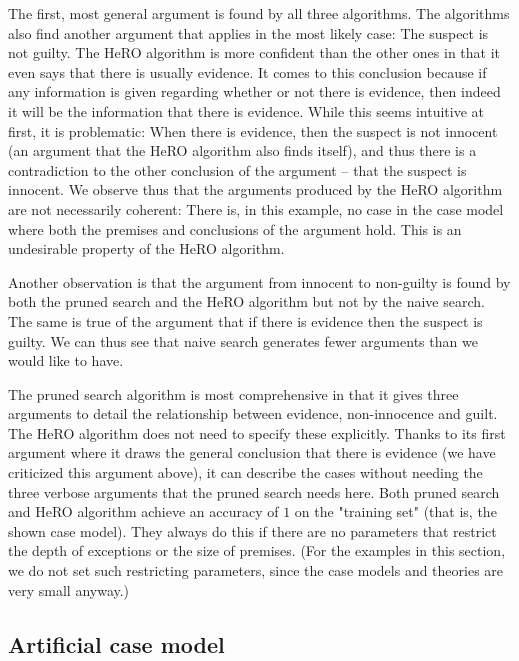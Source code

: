 The first, most general argument is found by all three algorithms. The algorithms also find another argument that applies in the most likely case: The suspect is not guilty. The HeRO algorithm is more confident than the other ones in that it even says that there is usually evidence. It comes to this conclusion because if any information is given regarding whether or not there is evidence, then indeed it will be the information that there is evidence. While this seems intuitive at first, it is problematic: When there is evidence, then the suspect is not innocent (an argument that the HeRO algorithm also finds itself), and thus there is a contradiction to the other conclusion of the argument -- that the suspect is innocent. We observe thus that the arguments produced by the HeRO algorithm are not necessarily coherent: There is, in this example, no case in the case model where both the premises and conclusions of the argument hold. This is an undesirable property of the HeRO algorithm.

Another observation is that the argument from innocent to non-guilty is found by both the pruned search and the HeRO algorithm but not by the naive search. The same is true of the argument that if there is evidence then the suspect is guilty. We can thus see that naive search generates fewer arguments than we would like to have.

The pruned search algorithm is most comprehensive in that it gives three arguments to detail the relationship between evidence, non-innocence and guilt. The HeRO algorithm does not need to specify these explicitly. Thanks to its first argument where it draws the general conclusion that there is evidence (we have criticized this argument above), it can describe the cases without needing the three verbose arguments that the pruned search needs here. Both pruned search and HeRO algorithm achieve an accuracy of $1$ on the "training set" (that is, the shown case model). They always do this if there are no parameters that restrict the depth of exceptions or the size of premises. (For the examples in this section, we do not set such restricting parameters, since the case models and theories are very small anyway.)

\subsection*{Artificial case model}


